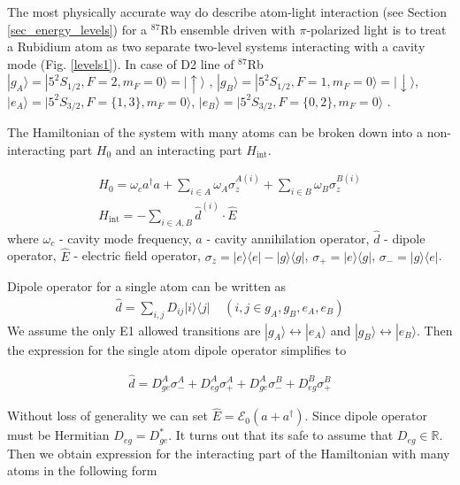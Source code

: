\documentclass{article}
\numberwithin{equation}{section}
\begin{document}
The most physically accurate way do describe atom-light interaction (see Section \ref{sec_energy_levels}) for a $^{87}$Rb ensemble driven with $\pi$-polarized light is to treat a Rubidium atom as two separate two-level systems interacting with a cavity mode (Fig. \ref{levels1}). In case of D2 line of $^{87}$Rb $|g_A\rangle = |5 ^2 S_{1/2}, F = 2, m_F = 0 \rangle = |\uparrow \rangle$ , $|g_B\rangle = |5 ^2 S_{1/2}, F = 1, m_F = 0 \rangle = |\downarrow \rangle$, $|e_A\rangle = |5 ^2 S_{3/2}, F = \{1,3\}, m_F = 0 \rangle$, $|e_B\rangle = |5 ^2 S_{3/2}, F = \{0,2\}, m_F = 0 \rangle$ \cite{Steck2003}. 

\vspace{5em}
\noindent The Hamiltonian of the system with many atoms can be broken down into a non-interacting part $H_0$ and an interacting part $H_\text{int}$. 

\begin{gather}
    H_0 = \omega_c a^\dagger a + \sum_{i \in A} \omega_A \sigma_z^{A (i)} + \sum_{i \in B} \omega_B \sigma_z^{B (i)} \\
    H_\text{int} = - \sum_{i \in A,B} \hat{d}^{(i)} \cdot \hat{E}
\end{gather}
where $\omega_c$ - cavity mode frequency, $a$ - cavity annihilation operator, $\hat{d}$ - dipole operator, $\hat{E}$ - electric field operator, $\sigma_z = |e \rangle \langle e| - |g \rangle \langle g|$, $\sigma_{+} = |e \rangle \langle g|$, $\sigma_{-} = |g \rangle \langle e|$.

\vspace{1em}
\noindent Dipole operator for a single atom can be written as 
\begin{gather}
    \hat{d} = \sum_{i,j} D_{ij} |i\rangle \langle j| ~~~~~(i,j \in {g_A, g_B, e_A, e_B})
\end{gather}
We assume the only E1 allowed transitions are $|g_A \rangle \leftrightarrow |e_A \rangle$ and $|g_B \rangle \leftrightarrow |e_B \rangle$. Then the expression for the single atom dipole operator simplifies to

\begin{gather}
    \hat{d} = D_{ge}^A \sigma_{-}^A + D_{eg}^A \sigma_{+}^A + D_{ge}^A \sigma_{-}^B + D_{eg}^B \sigma_{+}^B
\end{gather}

\vspace{1em}
\noindent Without loss of generality we can set $\hat{E} = \mathcal{E}_0 (a + a^\dagger)$. Since dipole operator must be Hermitian $D_{eg} = D_{ge}^{*}$. It turns out that its safe to assume that $D_{eg} \in \mathbb{R}$. Then we obtain expression for the interacting part of the Hamiltonian with many atoms in the following form
\end{document}
